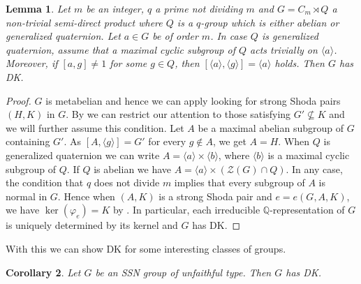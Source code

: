 \documentclass[a4paper,10pt]{amsart}
\newtheorem{lemma}{Lemma}[section]
\newtheorem{corollary}[lemma]{Corollary}
\theoremstyle{definition}
\theoremstyle{remark}
\newcommand{\ZZ}{\mathcal{Z}}
\newcommand{\Q}{{\mathbb Q}}
\begin{document}
\begin{lemma}\label{lem:DKForCmQ}
Let $m$ be an integer, $q$ a prime not dividing $m$ and $G = C_m \rtimes Q$ a non-trivial semi-direct product where $Q$ is a $q$-group which is either abelian or generalized quaternion. Let $a \in G$ be of order $m$. In case $Q$ is generalized quaternion, assume that a maximal cyclic subgroup of $Q$ acts trivially on $\langle a \rangle$. 
Moreover, if $[a,g] \neq 1$ for some $g \in Q$, then $[\langle a \rangle, \langle g \rangle] = \langle a \rangle$ holds. Then $G$ has DK.  
\end{lemma}
\begin{proof}
$G$ is metabelian and hence we can apply  looking for strong Shoda pairs $(H,K)$ in $G$. By  we can restrict our attention to those satisfying $G' \not\subseteq K$ and we will further assume this condition. Let $A$ be a maximal abelian subgroup of $G$ containing $G'$. As $[A,\langle g \rangle] = G'$ for every $g \notin A$, we get $A = H$. When $Q$ is generalized quaternion we can write $A = \langle a \rangle \times \langle b \rangle$, where $\langle b \rangle$ is a maximal cyclic subgroup of $Q$. If $Q$ is abelian we have $A = \langle a \rangle \times (\ZZ(G) \cap Q)$. In any case, the condition that $q$ does not divide $m$ implies that every subgroup of $A$ is normal in $G$. Hence when $(A,K)$ is a strong Shoda pair and $e = e(G,A,K)$, we have $\ker(\varphi_e) = K$ by . In particular, each irreducible $\Q$-representation of $G$ is uniquely determined by its kernel and $G$ has DK.
\end{proof}

With this we can show DK for some interesting classes of groups.

\begin{corollary}\label{cor:DKForUnfaithful}
Let $G$ be an SSN group of unfaithful type. Then $G$ has DK.
\end{corollary}
\end{document}
